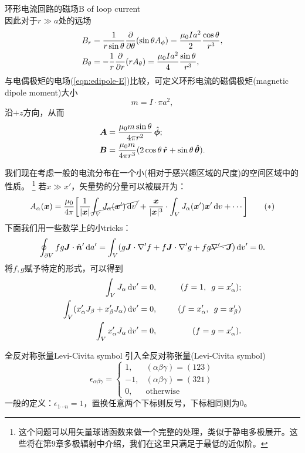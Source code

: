 \begin{example}{环形电流回路的磁场}{B of loop current}
\[    \]
    因此对于$r\gg a$处的远场
    \begin{align*}
        B_r&=\frac1{r\sin\theta}\pp\theta(\sin\theta A_\phi)=\frac{\mu_0Ia^2}2\frac{\cos\theta}{r^3},\\
        B_\theta&=-\frac1r\pp r(rA_\theta)=\frac{\mu_0Ia^2}4\frac{\sin\theta}{r^3},
    \end{align*}
    与电偶极矩的电场(\ref{eqn:edipole-E})比较，可定义环形电流的磁偶极矩(magnetic dipole moment)大小
    \[
        m=I\cdot\pi a^2,
    \]
    沿$+z$方向，从而 
    \begin{align}
        \bm A&=\frac{\mu_0m\sin\theta}{4\pi r^2}\mathop{}\!\hat{\bm \phi};\\
        \bm B&=\frac{\mu_0m}{4\pi r^3}(2\cos\theta\mathop{}\!\hat{\bm r}+\sin\theta\mathop{}\!\hat{\bm \theta}).
    \end{align}
\end{example}
我们现在考虑一般的电流分布在一个小(相对于感兴趣区域的尺度)的空间区域中的性质。
\footnote{这个问题可以用矢量球谐函数来做一个完整的处理，类似于静电多极展开。这些将在第9章多极辐射中介绍，我们在这里只满足于最低的近似阶。}
若$x\gg x'$，矢量势的分量可以被展开为：
\begin{equation}
    \label{eqn:A approx}
    A_\alpha(\bm x)=\frac{\mu_0}{4\pi}\biggl[\frac1{|\bm x|}\cancel{\int_V J_\alpha(\bm x')\mathop{}\!\mathrm{d} v'}+\frac{\bm x}{|\bm x|^3}\cdot\int_V J_\alpha(\bm x')\bm x'\mathop{}\!\mathrm{d} v+\cdots\biggr]
    \tag{$\ast$}
\end{equation}
下面我们用一些数学上的小tricks：
\[
    \oint_{\partial V}fg\bm J\cdot\mathop{}\!\hat{\bm n}'\mathop{}\!\mathrm{d} a'=\int_V(g\bm J\cdot\nabla'f+f\bm J\cdot\nabla'g+fg\cancel{\nabla'\cdot\bm J})\mathop{}\!\mathrm{d} v'=0.
\]
将$f,g$赋予特定的形式，可以得到
\begin{alignat*}{2}
    \int_V J_\alpha \mathop{}\!\mathrm{d} v'&=0,&\qquad (f=1,\enspace g=x_\alpha');\\
    \int_V(x_\alpha'J_\beta+x_\beta'J_\alpha)\mathop{}\!\mathrm{d} v'&=0,&(f=x_\alpha',\enspace g=x_\beta')\\
    \int_V x_\alpha'J_\alpha\mathop{}\!\mathrm{d} v'&=0,&(f=g=x_\alpha').
\end{alignat*} 
\begin{definition}{全反对称张量}{Levi-Civita symbol}
    引入全反对称张量(Levi-Civita symbol)
    \begin{equation}
        \epsilon_{\alpha\beta\gamma}=\begin{cases}
            1,&(\alpha\beta\gamma)=(123)\\
            -1,&(\alpha\beta\gamma)=(321)\\
            0,&\text{otherwise}
        \end{cases}
    \end{equation}
    一般的定义：$\epsilon_{1\cdots n}=1$，置换任意两个下标则反号，下标相同则为0。
\end{definition}
